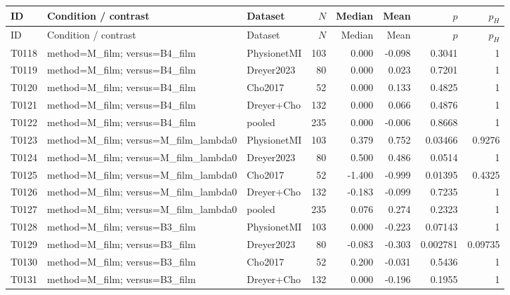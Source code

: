 \begin{longtable}{p{.45in}p{2.6in}p{.75in}rrrrr}
\toprule
ID & Condition / contrast & Dataset & $N$ & Median & Mean & $p$ & $p_H$ \\
\midrule
\endfirsthead
\toprule
ID & Condition / contrast & Dataset & $N$ & Median & Mean & $p$ & $p_H$ \\
\midrule
\endhead
T0118 & method=M\_\allowbreak{}film; versus=B4\_\allowbreak{}film & PhysionetMI & 103 & 0.000 & -0.098 & 0.3041 & 1 \\
T0119 & method=M\_\allowbreak{}film; versus=B4\_\allowbreak{}film & Dreyer2023 & 80 & 0.000 & 0.023 & 0.7201 & 1 \\
T0120 & method=M\_\allowbreak{}film; versus=B4\_\allowbreak{}film & Cho2017 & 52 & 0.000 & 0.133 & 0.4825 & 1 \\
T0121 & method=M\_\allowbreak{}film; versus=B4\_\allowbreak{}film & Dreyer+Cho & 132 & 0.000 & 0.066 & 0.4876 & 1 \\
T0122 & method=M\_\allowbreak{}film; versus=B4\_\allowbreak{}film & pooled & 235 & 0.000 & -0.006 & 0.8668 & 1 \\
T0123 & method=M\_\allowbreak{}film; versus=M\_\allowbreak{}film\_\allowbreak{}lambda0 & PhysionetMI & 103 & 0.379 & 0.752 & 0.03466 & 0.9276 \\
T0124 & method=M\_\allowbreak{}film; versus=M\_\allowbreak{}film\_\allowbreak{}lambda0 & Dreyer2023 & 80 & 0.500 & 0.486 & 0.0514 & 1 \\
T0125 & method=M\_\allowbreak{}film; versus=M\_\allowbreak{}film\_\allowbreak{}lambda0 & Cho2017 & 52 & -1.400 & -0.999 & 0.01395 & 0.4325 \\
T0126 & method=M\_\allowbreak{}film; versus=M\_\allowbreak{}film\_\allowbreak{}lambda0 & Dreyer+Cho & 132 & -0.183 & -0.099 & 0.7235 & 1 \\
T0127 & method=M\_\allowbreak{}film; versus=M\_\allowbreak{}film\_\allowbreak{}lambda0 & pooled & 235 & 0.076 & 0.274 & 0.2323 & 1 \\
T0128 & method=M\_\allowbreak{}film; versus=B3\_\allowbreak{}film & PhysionetMI & 103 & 0.000 & -0.223 & 0.07143 & 1 \\
T0129 & method=M\_\allowbreak{}film; versus=B3\_\allowbreak{}film & Dreyer2023 & 80 & -0.083 & -0.303 & 0.002781 & 0.09735 \\
T0130 & method=M\_\allowbreak{}film; versus=B3\_\allowbreak{}film & Cho2017 & 52 & 0.200 & -0.031 & 0.5436 & 1 \\
T0131 & method=M\_\allowbreak{}film; versus=B3\_\allowbreak{}film & Dreyer+Cho & 132 & 0.000 & -0.196 & 0.1955 & 1 \\

\end{longtable}
